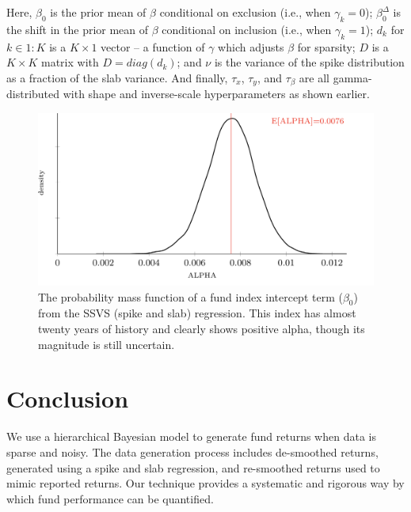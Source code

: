 \documentclass[11pt]{article}
\begin{document}
Here, $\beta_0$ is the prior mean of $\beta$ conditional on exclusion (i.e., when $\gamma_k = 0$); $\beta_0^\Delta$ is the shift in the prior mean of $\beta$ conditional on inclusion (i.e., when $\gamma_k = 1$); $d_k$ for $k \in 1:K$ is a $K \times 1$ vector -- a function of $\gamma$ which adjusts $\beta$ for sparsity; $D$ is a $K \times K$ matrix with $D = diag(d_k)$; and $\nu$ is the variance of the spike distribution as a fraction of the slab variance. And finally, $\tau_x$, $\tau_y$, and $\tau_\beta$ are all gamma-distributed with shape and inverse-scale hyperparameters as shown earlier. \\

\begin{figure}[!h]
	\centering
	\includegraphics[width=400pt]{clinton_alpha_3_preqin.png}
	\parbox{400pt}{\caption{The probability mass function of a fund index intercept term ($\beta_0$) from the SSVS (spike and slab) regression. This index has almost twenty years of history and clearly shows positive alpha, though its magnitude is still uncertain.}}
\end{figure}

\section{Conclusion}
We use a hierarchical Bayesian model to generate fund returns when data is sparse and noisy. The data generation process includes de-smoothed returns, generated using a spike and slab regression, and re-smoothed returns used to mimic reported returns. Our technique provides a systematic and rigorous way by which fund performance can be quantified.

\newpage

\singlespacing
\setlength\bibsep{3pt}



\end{document}
